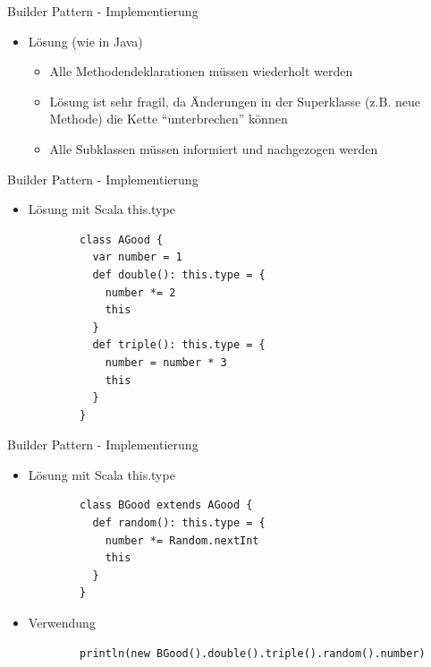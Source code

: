 \documentclass{beamer}
\begin{document}

\begin{frame}[fragile]{Builder Pattern - Implementierung}
\begin{itemize}
	\item Lösung (wie in Java)
		\begin{itemize}
			\item Alle Methodendeklarationen müssen wiederholt werden
			\item Lösung ist sehr fragil, da Änderungen in der Superklasse (z.B. neue Methode) die Kette "`unterbrechen"' können
			\item Alle Subklassen müssen informiert und nachgezogen werden
		\end{itemize}
\end{itemize}
\end{frame}


\begin{frame}[fragile]{Builder Pattern - Implementierung}
\begin{itemize}
	\item Lösung mit Scala this.type
		\begin{lstlisting}
		class AGood {
		  var number = 1
		  def double(): this.type = {
		    number *= 2
		    this
		  }
		  def triple(): this.type = {
		    number = number * 3
		    this
		  }
		}
		\end{lstlisting}
\end{itemize}
\end{frame}


\begin{frame}[fragile]{Builder Pattern - Implementierung}
\begin{itemize}
	\item Lösung mit Scala this.type
		\begin{lstlisting}
		class BGood extends AGood {
		  def random(): this.type = {
		    number *= Random.nextInt
		    this
		  }
		}
		\end{lstlisting}
	\item Verwendung
		\begin{lstlisting}
		println(new BGood().double().triple().random().number)
		\end{lstlisting}
\end{itemize}
\end{frame}
\end{document}
